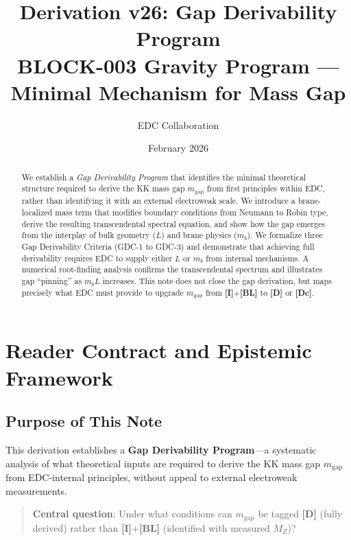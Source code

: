 \documentclass[11pt,a4paper]{article}
\newcommand{\mgap}{m_{\mathrm{gap}}}
\newcommand{\mb}{m_b}
\newcommand{\MZ}{M_Z}
\newcommand{\tagD}{\textbf{[D]}}
\newcommand{\tagDc}{\textbf{[Dc]}}
\newcommand{\tagI}{\textbf{[I]}}
\newcommand{\tagBL}{\textbf{[BL]}}
\theoremstyle{definition}
\theoremstyle{plain}
\theoremstyle{remark}
\begin{document}
\title{\textbf{Derivation v26: Gap Derivability Program}\\[0.5em]
\large BLOCK-003 Gravity Program --- Minimal Mechanism for Mass Gap}
\author{EDC Collaboration}
\date{February 2026}
\maketitle

\begin{abstract}
We establish a \emph{Gap Derivability Program} that identifies the minimal theoretical
structure required to derive the KK mass gap $\mgap$ from first principles within EDC,
rather than identifying it with an external electroweak scale. We introduce a
brane-localized mass term that modifies boundary conditions from Neumann to Robin type,
derive the resulting transcendental spectral equation, and show how the gap emerges
from the interplay of bulk geometry ($L$) and brane physics ($\mb$). We formalize
three Gap Derivability Criteria (GDC-1 to GDC-3) and demonstrate that achieving full
derivability requires EDC to supply either $L$ or $\mb$ from internal mechanisms.
A numerical root-finding analysis confirms the transcendental spectrum and illustrates
gap ``pinning'' as $\mb L$ increases. This note does not close the gap derivation,
but maps precisely what EDC must provide to upgrade $\mgap$ from \tagI{}+\tagBL{}
to \tagD{} or \tagDc{}.
\end{abstract}

\tableofcontents
\newpage

\section{Reader Contract and Epistemic Framework}
\label{sec:contract}

\subsection{Purpose of This Note}

This derivation establishes a \textbf{Gap Derivability Program}---a systematic
analysis of what theoretical inputs are required to derive the KK mass gap $\mgap$
from EDC-internal principles, without appeal to external electroweak measurements.

\begin{quote}
\textbf{Central question}: Under what conditions can $\mgap$ be tagged \tagD{}
(fully derived) rather than \tagI{}+\tagBL{} (identified with measured $\MZ$)?
\end{quote}
\end{document}
